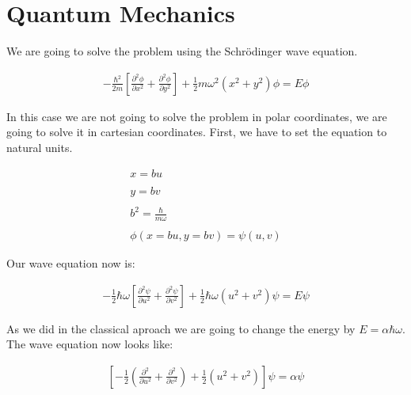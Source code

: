 \section{Quantum Mechanics}

We are going to solve the problem using the Schrödinger wave equation.

\begin{equation}
  \begin{array}{c}
    -\frac{\hbar^2}{2m} \left[\frac{\partial^2\phi}{\partial x^2} + \frac{\partial^2\phi}{\partial y^2}\right] + \frac{1}{2} m \omega^2 (x^2+y^2)\phi = E \phi
  \end{array}
\end{equation}

In this case we are not going to solve the problem in polar coordinates, we are going to solve it in cartesian coordinates. First, we have to set the equation to natural units.

\begin{equation}
  \begin{array}{c}
    x = b u
    \\

    \\
    y = b v
    \\

    \\
    b^2 = \frac{\hbar}{m\omega}
    \\

    \\
    \phi(x=bu,y=bv) = \psi(u,v)
  \end{array}
\end{equation}

Our wave equation now is:

\begin{equation}
  \begin{array}{c}
    -\frac{1}{2}\hbar\omega \left[\frac{\partial^2\psi}{\partial u^2} + \frac{\partial^2\psi}{\partial v^2}\right] + \frac{1}{2} \hbar \omega (u^2+v^2)\psi = E \psi
  \end{array}
\end{equation}

As we did in the classical aproach we are going to change the energy by $E=\alpha\hbar\omega$. The wave equation now looks like:

\begin{equation}
  \begin{array}{c}
    \left[-\frac{1}{2}\left(\frac{\partial^2}{\partial u^2}+\frac{\partial^2}{\partial v^2}\right)+\frac{1}{2}(u^2+v^2)\right]\psi = \alpha \psi
  \end{array}
\end{equation}

